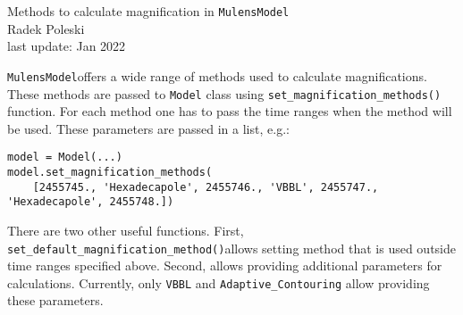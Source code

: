 \documentclass[12pt]{article}
\newcommand\MM{{\tt MulensModel}}
\begin{document}

\begin{center}
{\LARGE Methods to calculate magnification in \MM}\\
\bigskip
Radek Poleski\\
last update: Jan 2022
\end{center}

\bigskip\bigskip

\MM offers a wide range of methods used to calculate magnifications. 
These methods are passed to {\tt Model} class using 
{\tt set\_magnification\_methods()} function.  For each method one has to 
pass the time ranges when the method will be used.  These parameters are 
passed in a list, e.g.:

\begin{verbatim}
model = Model(...)
model.set_magnification_methods(
    [2455745., 'Hexadecapole', 2455746., 'VBBL', 2455747., 'Hexadecapole', 2455748.])
\end{verbatim}

There are two other useful functions. 
First, {\tt set\_default\_magnification\_method()}\linebreak allows setting method that 
is used outside time ranges specified above.  
Second,  allows 
providing additional parameters for calculations.  Currently, only 
{\tt VBBL} and {\tt Adaptive\_Contouring} allow providing these parameters. 
\end{document}
